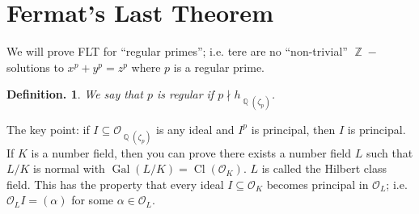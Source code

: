 \documentclass[11pt, a4paper]{memoir}
\DeclareMathOperator{\Q}{{\mathbb{Q}}}
\DeclareMathOperator{\Z}{{\mathbb{Z}}}
\theoremstyle{change}
\theoremstyle{plain}
\theoremstyle{nonumberplain}
\newtheorem{definition}{Definition.}
\DeclareMathOperator{\Gal}{Gal}
\DeclareMathOperator{\Cl}{Cl}
\numberwithin{equation}{section}
\begin{document}
\section{Fermat's Last Theorem}
We will prove FLT for ``regular primes''; i.e. tere are no ``non-trivial'' $\Z-$solutions to $x^p+y^p=z^p$ where $p$ is a regular prime.
\begin{definition}
    We say that $p$ is regular if $p\nmid h_{\Q(\zeta_p)}$.
\end{definition}
The key point: if $I\subseteq\mathcal{O}_{\Q(\zeta_p)}$ is any ideal and $I^p$ is principal, then $I$ is principal.
If $K$ is a number field, then you can prove there exists a number field $L$ such that $L/K$ is normal with $\Gal(L/K)=\Cl(\mathcal{O}_K)$.
$L$ is called the Hilbert class field.
This has the property that every ideal $I\subseteq\mathcal{O}_K$ becomes principal in $\mathcal{O}_L$; i.e. $\mathcal{O}_LI=(\alpha)$ for some $\alpha\in\mathcal{O}_L$.
\end{document}
